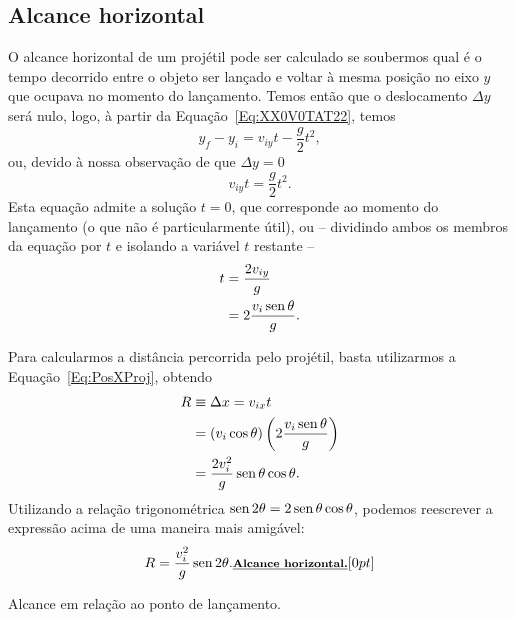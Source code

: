 \subsection{Alcance horizontal}

O alcance horizontal de um projétil pode ser calculado se soubermos qual é o tempo decorrido entre o objeto ser lançado e voltar à mesma posição no eixo $y$ que ocupava no momento do lançamento. Temos então que o deslocamento $\Delta y$ será nulo, logo, à partir da Equação~\eqref{Eq:XX0V0TAT22}, temos
\begin{equation}
  y_f-y_i = v_{iy}t - \frac{g}{2}t^2,
\end{equation}
%
ou, devido à nossa observação de que $\Delta y = 0$
\begin{equation}
  v_{iy}t = \frac{g}{2} t^2.
\end{equation}
%
Esta equação admite a solução $t = 0$, que corresponde ao momento do lançamento (o que não é particularmente útil), ou -- dividindo ambos os membros da equação por $t$ e isolando a variável $t$ restante --
\begin{align}
  t &= \frac{2v_{iy}}{g} \\
  &= 2\frac{v_i\operatorname{sen}\theta}{g}.
\end{align}

Para calcularmos a distância percorrida pelo projétil, basta utilizarmos a Equação~\eqref{Eq:PosXProj}, obtendo
\begin{align}
  R &\equiv \Delta x = v_{ix} t \\
  &= \left(v_i\cos\theta\right) \left(2\frac{v_i\operatorname{sen}\theta}{g}\right) \\
  &= \frac{2v_i^2}{g}\operatorname{sen}\theta\cos\theta.
\end{align}
%
Utilizando a relação trigonométrica $\operatorname{sen} 2\theta = 2 \operatorname{sen}\theta\cos\theta$, podemos reescrever a expressão acima de uma maneira mais amigável:
\begin{equation}
  R = \frac{v_i^2}{g}\operatorname{sen}2\theta. \relax{\footnotesize\emph{\textbf{Alcance horizontal.}}}[0pt]
\end{equation}

\begin{marginfigure}[-7cm]
\centering
{}
\caption{Alcance em relação ao ponto de lançamento.}
\end{marginfigure}

